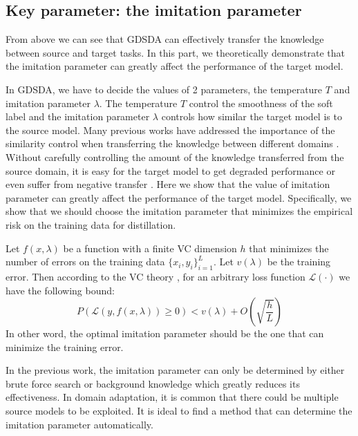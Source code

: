 \subsection{Key parameter: the imitation parameter}\label{sec:key}
From above we can see that GDSDA can effectively transfer the knowledge between source and target tasks. In this part, we theoretically demonstrate that the imitation parameter can greatly affect the performance of the target model.

In GDSDA, we have to decide the values of 2 parameters, the temperature $T$ and imitation parameter $\lambda$. The temperature $T$ control the smoothness of the soft label and the imitation parameter $\lambda$ controls how similar the target model is to the source model. Many previous works have addressed the importance of the similarity control when transferring the knowledge between different domains \cite{duan2012learning,duan2012visual}. Without carefully controlling the amount of the knowledge transferred from the source domain, it is easy for the target model to get degraded performance or even suffer from negative transfer \cite{pan2010survey}.
Here we show that the value of imitation parameter can greatly affect the performance of the target model. Specifically, we show that we should choose the imitation parameter that minimizes the empirical risk on the training data for distillation.

Let $f(x,\lambda)$ be a function with a finite VC dimension $h$ that minimizes the number of errors on the training data $\{x_i,y_i\}_{i=1}^L$. Let $v(\lambda)$ be the training error. Then according to the VC theory \cite{vapnik1999overview}, for an arbitrary loss function $\mathcal{L}(\cdot)$ we have the following bound:
\begin{equation}\label{eq:lambda_constraint}
P\left(\mathcal{L}\left(y,f(x,\lambda)\right)\geq 0\right) < v(\lambda)+O\left(\sqrt{\frac{h}{L}}\right)
\end{equation}
In other word, the optimal imitation parameter should be the one that can minimize the training error.  

In the previous work, the imitation parameter can only be determined by either brute force search \cite{lopez2015unifying} or background knowledge \cite{Tzeng_2015_ICCV} which greatly reduces its effectiveness. In domain adaptation, it is common that there could be multiple source models to be exploited. It is ideal to find a method that can determine the imitation parameter automatically.
